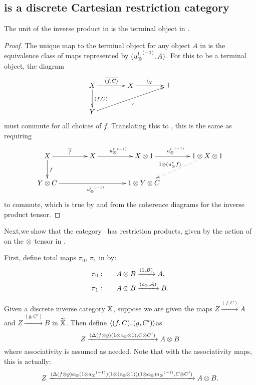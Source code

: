 \subsection{\hypXt is a discrete Cartesian restriction category} %
\label{sec:the_category_hypxt_is_cartesian}



\begin{lemma}\label{lem:tensor_unit_of_x_is_terminal_object_of_xt}
  The unit of the inverse product in \X is the terminal object in \Xt.
\end{lemma}
\begin{proof}
  The unique map to the terminal object for any object $A$ in \Xt is the equivalence class of maps
  represented by $({u_{\otimes}^l}^{(-1)},A)$. For this to be a terminal object, the diagram
  \[
    \xymatrix @C=40pt @R=25pt{
      X \ar[r]^{\restr{(f,C)}} \ar[d]^{(f,C)} & X \ar[r]^{!_X}  &\top  \\
      Y \ar[urr]_{!_Y}
    }
  \]
  must commute for all choices of $f$. Translating this to \X, this is the same as requiring
  \[
    \xymatrix @C=40pt @R=25pt{
      X \ar[r]^{\restr{f}} \ar[d]^{f} & X \ar[r]^{\inv{\usr} }
      & X\*1 \ar[r]^{\inv{\usl}}  &1\*X\*1 \ar@{.>}[dl]_{1\*(\usr f)}  \\
      Y \*C\ar[rr]_{\inv{\usl}} & & 1 \*Y \* C
    }
  \]
  to commute, which is true by \rone and from the coherence diagrams for the inverse product tensor.
\end{proof}

Next,we show that the category \Xt\ has restriction products, given by the action of \wtc on
the $\otimes$ tensor in \X.

First, define total maps $\pi_0$, $\pi_1$ in \Xt by:
\begin{align}
  \pi_0:\qquad & A \otimes B \xrightarrow{(1,B)} A, \label{eq:defn:pia}\\
  \pi_1:\qquad & A \otimes B \xrightarrow{(c_{\otimes},A)} B. \label{eq:defn:pib}
\end{align}

\begin{definition}\label{def:product_map_in_xt}
  Given a discrete inverse category $\mathbb{X}$, suppose we are given the maps $ Z \xrightarrow{(f,C)} A$
  and $Z \xrightarrow{(g,C')} B$ in $\widetilde{\mathbb{X}}$. Then define $\langle(f,C),(g,C')\rangle$as
  \begin{equation}
    Z\xrightarrow{(\Delta  ( f \otimes g )  (1\otimes c_{\otimes} \otimes 1), C\otimes C')} A \otimes B\label{eq:defn:fg}
  \end{equation}
  where associativity is assumed as needed. Note that with the associativity maps, this is actually:
  \begin{equation}
    Z\xrightarrow{(\Delta  ( f \otimes g )  a_{\otimes} (1\otimes{a_{\otimes}}^{(-1)})
      (1\otimes (c_{\otimes} \otimes 1)) (1\otimes a_{\otimes}) {a_{\otimes}}^{(-1)}, C\otimes C')} A \otimes B.\label{eq:defn:fg2}
  \end{equation}
\end{definition}


